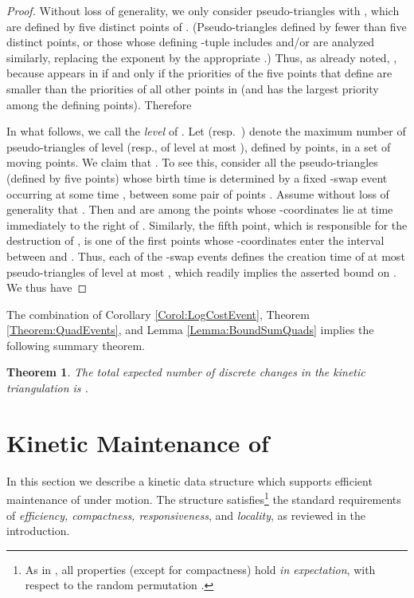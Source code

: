 \documentclass[11pt]{article}
\newtheorem{theorem}{Theorem}[section]
\begin{document}
\begin{proof}
Without loss of generality, we only consider pseudo-triangles  with , which are defined by five distinct points of . (Pseudo-triangles defined by fewer than five distinct points, or those
whose defining -tuple includes  and/or  are analyzed similarly, replacing the exponent  by the appropriate .)
Thus, as already noted, , because  appears in  if and only if the priorities of the
five points that define  are smaller than the priorities of 
all other points in 
(and  has the largest priority among the defining points).
Therefore


In what follows, we call  
 the {\em level} of .
Let  (resp.\ ) denote the
maximum number of pseudo-triangles of level  (resp., of level at most ), defined by  points, in a set of
  moving points.
We claim that . To see this, consider all the pseudo-triangles  (defined by five points) whose birth time is determined by a fixed -swap event occurring at some time , between some pair of points . Assume without loss of generality that . Then  and  are among the  points whose -coordinates lie at time  immediately to the right of .
Similarly, the fifth point, which is responsible for the destruction of , is one of the first  points whose -coordinates enter the interval between  and . Thus, each of the  -swap events defines the creation time of at most  pseudo-triangles of level at most , which readily implies the asserted bound on . We thus have


\end{proof}





The combination of Corollary \ref{Corol:LogCostEvent},
Theorem 
\ref{Theorem:QuadEvents}, and Lemma \ref{Lemma:BoundSumQuads} implies
the following summary theorem.
\begin{theorem}
The total expected number of discrete changes in the kinetic triangulation  is .
\end{theorem}

\section{Kinetic Maintenance of }\label{Sec:DataStruct}
In this section we describe a kinetic data structure which
supports efficient maintenance of  under motion.
The structure satisfies\footnote{\small As in \cite{AKS}, all properties (except for compactness) hold \textit{in expectation}, with respect to the random permutation .} the standard requirements of \textit{efficiency, compactness, responsiveness}, and \textit{locality}, as reviewed in the introduction.
\end{document}

